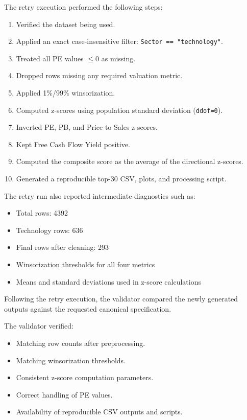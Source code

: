 The retry execution performed the following steps:

\begin{enumerate}
  \item Verified the dataset being used.
  \item Applied an exact case-insensitive filter:
    \texttt{Sector == "technology"}.
  \item Treated all PE values $\leq 0$ as missing.
  \item Dropped rows missing any required valuation metric.
  \item Applied 1\%/99\% winsorization.
  \item Computed z-scores using population standard deviation (\texttt{ddof=0}).
  \item Inverted PE, PB, and Price-to-Sales z-scores.
  \item Kept Free Cash Flow Yield positive.
  \item Computed the composite score as the average of the directional z-scores.
  \item Generated a reproducible top-30 CSV, plots, and processing script.
\end{enumerate}

The retry run also reported intermediate diagnostics such as:

\begin{itemize}
  \item Total rows: 4392
  \item Technology rows: 636
  \item Final rows after cleaning: 293
  \item Winsorization thresholds for all four metrics
  \item Means and standard deviations used in z-score calculations
\end{itemize}


Following the retry execution, the validator compared the newly generated outputs against the requested canonical specification.

The validator verified:

\begin{itemize}
  \item Matching row counts after preprocessing.
  \item Matching winsorization thresholds.
  \item Consistent z-score computation parameters.
  \item Correct handling of PE values.
  \item Availability of reproducible CSV outputs and scripts.
\end{itemize}

